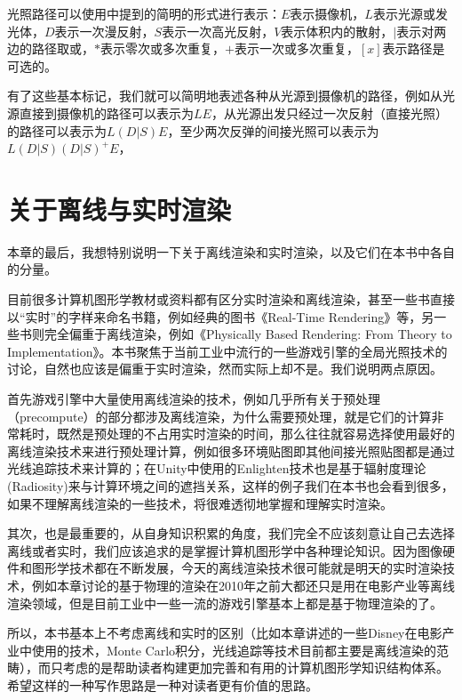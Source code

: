 光照路径可以使用\cite{a:Adaptiveradiositytexturesforbidirectionalraytracing}中提到的简明的形式进行表示：$E$表示摄像机，$L$表示光源或发光体，$D$表示一次漫反射，$S$表示一次高光反射，$V$表示体积内的散射，$|$表示对两边的路径取或，$*$表示零次或多次重复，$+$表示一次或多次重复，$[x]$表示路径是可选的。

有了这些基本标记，我们就可以简明地表述各种从光源到摄像机的路径，例如从光源直接到摄像机的路径可以表示为$LE$，从光源出发只经过一次反射（直接光照）的路径可以表示为$L(D|S)E$，至少两次反弹的间接光照可以表示为$L(D|S)(D|S)^{+}E$，



\section{关于离线与实时渲染}
本章的最后，我想特别说明一下关于离线渲染和实时渲染，以及它们在本书中各自的分量。

目前很多计算机图形学教材或资料都有区分实时渲染和离线渲染，甚至一些书直接以“实时”的字样来命名书籍，例如经典的图书《Real-Time Rendering》等，另一些书则完全偏重于离线渲染，例如《Physically Based Rendering: From Theory to Implementation》。本书聚焦于当前工业中流行的一些游戏引擎的全局光照技术的讨论，自然也应该是偏重于实时渲染，然而实际上却不是。我们说明两点原因。

首先游戏引擎中大量使用离线渲染的技术，例如几乎所有关于预处理（precompute）的部分都涉及离线渲染，为什么需要预处理，就是它们的计算非常耗时，既然是预处理的不占用实时渲染的时间，那么往往就容易选择使用最好的离线渲染技术来进行预处理计算，例如很多环境贴图即其他间接光照贴图都是通过光线追踪技术来计算的；在Unity中使用的Enlighten技术也是基于辐射度理论(Radiosity)来与计算环境之间的遮挡关系，这样的例子我们在本书也会看到很多，如果不理解离线渲染的一些技术，将很难透彻地掌握和理解实时渲染。

其次，也是最重要的，从自身知识积累的角度，我们完全不应该刻意让自己去选择离线或者实时，我们应该追求的是掌握计算机图形学中各种理论知识。因为图像硬件和图形学技术都在不断发展，今天的离线渲染技术很可能就是明天的实时渲染技术，例如本章讨论的基于物理的渲染在2010年之前大都还只是用在电影产业等离线渲染领域，但是目前工业中一些一流的游戏引擎基本上都是基于物理渲染的了。

所以，本书基本上不考虑离线和实时的区别（比如本章讲述的一些Disney在电影产业中使用的技术，Monte Carlo积分，光线追踪等技术目前都主要是离线渲染的范畴），而只考虑的是帮助读者构建更加完善和有用的计算机图形学知识结构体系。希望这样的一种写作思路是一种对读者更有价值的思路。



